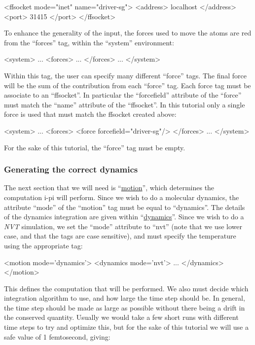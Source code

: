 \documentclass[11pt,english,fleqn]{report}
\newenvironment{code}{%
\footnotesize 
\verbatim
}{
\endverbatim
\normalsize
}
\begin{document}
\begin{code}
<ffsocket mode="inet" name="driver-sg">
   <address> localhost </address>
   <port> 31415 </port>
</ffsocket>
\end{code}

To enhance the generality of the input, the forces used to move the
atoms are red from the ``forces'' tag, within the ``system'' environment:

\begin{code}
<system>
   ...
   <forces>
      ...
   </forces>
   ...
</system>
\end{code}

Within this tag, the user can specify many different ``force''
tags. The final force will be the sum of the contribution from each
``force'' tag. Each force tag must be associate to an
``ffsocket''. In particular the ``forcefield'' attribute of the
``force'' must match the ``name'' attribute of the ``ffsocket''. In
this tutorial only a single force is used that must match the ffsocket
created above:

\begin{code}
<system>
   ...
   <forces>
      <force forcefield="driver-sg"/>
   </forces>
   ...
</system>
\end{code}

For the sake of this tutorial, the ``force'' tag must be empty.

\subsubsection{Generating the correct dynamics}

The next section that we will need is 
{}``\hyperref[MOTION]{motion}'', which determines the computation i-pi
will perform. Since we wish to do a molecular dynamics, the attribute
``mode'' of the ``motion'' tag must be equal to ``dynamics''.
The details of the dynamics integration are given within
{}``\hyperref[DYNAMICS]{dynamics}''.  Since we wish to
do a \emph{NVT} simulation, we set the {}``mode'' attribute to {}``nvt''
(note that we use lower case, and that the tags are case sensitive),
and must specify the temperature using the appropriate tag:

\begin{code}
<motion mode='dynamics'>
   <dynamics mode='nvt'>
      ...
   </dynamics>
</motion>
\end{code}

This defines the computation that will be performed. We also must decide
which integration algorithm to use, and how large the time step should
be. In general, the time step should be made as large as possible
without there being a drift in the conserved quantity. Usually we
would take a few short runs with different time steps to try and optimize
this, but for the sake of this tutorial we will use a safe value of
1 femtosecond, giving:
\end{document}
